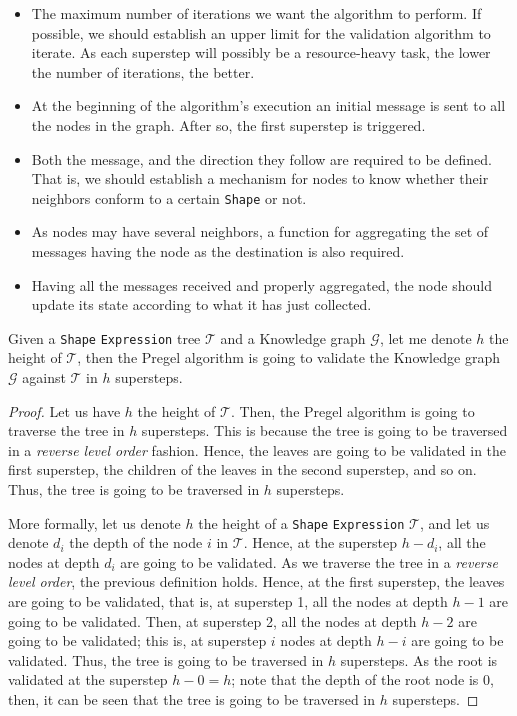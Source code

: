 \begin{itemize}
    \itemsep0.5em
    \item The maximum number of iterations we want the algorithm to perform. If possible, we should establish an upper limit for the validation algorithm to iterate. As each superstep will possibly be a resource-heavy task, the lower the number of iterations, the better.
    \item At the beginning of the algorithm's execution an initial message is sent to all the nodes in the graph. After so, the first superstep is triggered.
    \item Both the message, and the direction they follow are required to be defined. That is, we should establish a mechanism for nodes to know whether their neighbors conform to a certain \texttt{Shape} or not.
    \item As nodes may have several neighbors, a function for aggregating the set of messages having the node as the destination is also required.
    \item Having all the messages received and properly aggregated, the node should update its state according to what it has just collected.
\end{itemize}

\begin{theorem}
    Given a \texttt{Shape} \texttt{Expression} tree $\mathcal{T}$ and a Knowledge graph $\mathcal{G}$, let me denote $h$ the height of $\mathcal{T}$, then the Pregel algorithm is going to validate the Knowledge graph $\mathcal{G}$ against $\mathcal{T}$ in $h$ supersteps.
\end{theorem}

\begin{proof}
    Let us have $h$ the height of $\mathcal{T}$. Then, the Pregel algorithm is going to traverse the tree in $h$ supersteps. This is because the tree is going to be traversed in a \textit{reverse level order} fashion. Hence, the leaves are going to be validated in the first superstep, the children of the leaves in the second superstep, and so on. Thus, the tree is going to be traversed in $h$ supersteps.

    More formally, let us denote $h$ the height of a \texttt{Shape} \texttt{Expression} $\mathcal{T}$, and let us denote $d_i$ the depth of the node $i$ in $\mathcal{T}$. Hence, at the superstep $h - d_i$, all the nodes at depth $d_i$ are going to be validated. As we traverse the tree in a \textit{reverse level order}, the previous definition holds. Hence, at the first superstep, the leaves are going to be validated, that is, at superstep 1, all the nodes at depth $h - 1$ are going to be validated. Then, at superstep 2, all the nodes at depth $h - 2$ are going to be validated; this is, at superstep $i$ nodes at depth $h - i$ are going to be validated. Thus, the tree is going to be traversed in $h$ supersteps. As the root is validated at the superstep $h - 0 = h$; note that the depth of the root node is 0, then, it can be seen that the tree is going to be traversed in $h$ supersteps.
\end{proof}

